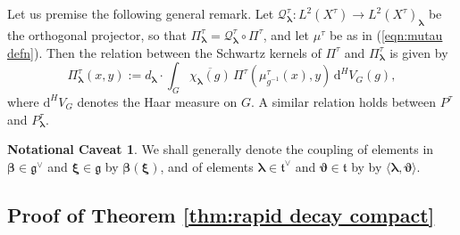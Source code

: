 \documentclass[12pt,a4paper]{article}
\theoremstyle{plain}
\theoremstyle{definition}
\newtheorem{notn}[thm]{Notational Caveat}%
\begin{document}
Let us premise the following general remark.
Let $\mathcal{Q}^\tau_{\boldsymbol{\lambda}}:L^2(X^\tau)
\rightarrow L^2(X^\tau)_{\boldsymbol{\lambda}}$ be the orthogonal
projector, so that $\Pi^\tau_{\boldsymbol{\lambda}}=\mathcal{Q}^\tau_{\boldsymbol{\lambda}}
\circ \Pi^\tau$, and let $\mu^\tau$ 
be as in (\ref{eqn:mutau defn}).
Then the relation between the Schwartz kernels of
$\Pi^\tau$ and 
$\Pi^\tau_{\boldsymbol{\lambda}}$ is given
by 
\begin{equation}
\label{eqn:equivariant szego}
\Pi^\tau_{\boldsymbol{\lambda}}(x,y):=
d_{\boldsymbol{\lambda}}\cdot 
\int_G \overline{\chi_{\boldsymbol{\lambda}}(g)}\,
\Pi^\tau
\left(\mu^\tau_{g^{-1}}(x),y   \right)\,
\mathrm{d}^HV_G(g),
\end{equation}
where $\mathrm{d}^H V_G$ denotes the Haar measure on
$G$. A similar relation holds between $P^\tau$
and $P^\tau_{\boldsymbol{\lambda}}$.


\begin{notn}
We shall generally denote the coupling of elements in $\boldsymbol{\beta}\in\mathfrak{g}^\vee$ and $\boldsymbol{\xi}\in \mathfrak{g}$ by
$\boldsymbol{\beta}(\boldsymbol{\xi})$, and of elements
$\boldsymbol{\lambda}\in \mathfrak{t}^\vee$ and 
$\boldsymbol{\vartheta}\in \mathfrak{t}$ by
by $\langle\boldsymbol{\lambda},\boldsymbol{\vartheta}\rangle$.
\end{notn}


\subsection{Proof of Theorem \ref{thm:rapid decay compact}}
\label{sctn:rapid decay compact}
\end{document}

